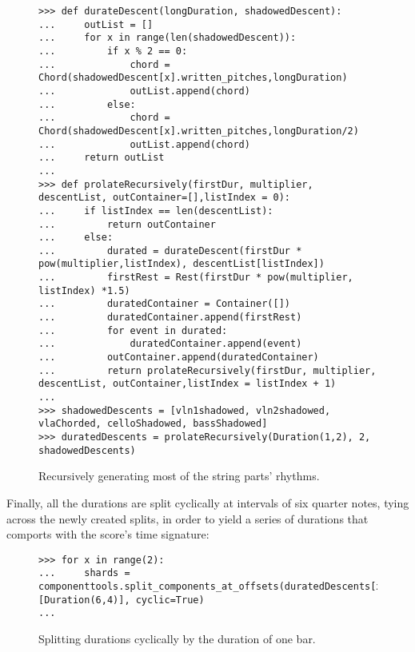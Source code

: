 \begin{figure}[H] 
\begin{lstlisting}[basicstyle=\scriptsize\ttfamily, breaklines=True, tabsize=4, showtabs=false, showspaces=false]
>>> def durateDescent(longDuration, shadowedDescent):
...     outList = []
...     for x in range(len(shadowedDescent)):
... 	    if x % 2 == 0:
... 		    chord = Chord(shadowedDescent[x].written_pitches,longDuration)
... 		    outList.append(chord)
... 	    else:
... 		    chord = Chord(shadowedDescent[x].written_pitches,longDuration/2)
... 		    outList.append(chord)
...     return outList
... 
>>> def prolateRecursively(firstDur, multiplier, descentList, outContainer=[],listIndex = 0):
... 	if listIndex == len(descentList):
... 		return outContainer
... 	else:
... 		durated = durateDescent(firstDur * pow(multiplier,listIndex), descentList[listIndex])
... 		firstRest = Rest(firstDur * pow(multiplier, listIndex) *1.5)
... 		duratedContainer = Container([])
... 		duratedContainer.append(firstRest)
... 		for event in durated:
... 			duratedContainer.append(event)
... 		outContainer.append(duratedContainer)
... 		return prolateRecursively(firstDur, multiplier, descentList, outContainer,listIndex = listIndex + 1)
... 
>>> shadowedDescents = [vln1shadowed, vln2shadowed, vlaChorded, celloShadowed, bassShadowed]
>>> duratedDescents = prolateRecursively(Duration(1,2), 2, shadowedDescents)\end{lstlisting}

\caption{Recursively generating most of the string parts' rhythms. } 
\end{figure}

Finally, all the durations are split cyclically at intervals of six quarter notes, tying across the newly created splits, in order to yield a series of durations that comports with the score's time signature:  

\begin{figure}[H] 
\begin{lstlisting}[basicstyle=\scriptsize\ttfamily, breaklines=True, tabsize=4, showtabs=false, showspaces=false]
>>> for x in range(2):
... 	shards = componenttools.split_components_at_offsets(duratedDescents[x].leaves, [Duration(6,4)], cyclic=True)
... \end{lstlisting}

\caption{Splitting durations cyclically by the duration of one bar. } 
\end{figure}

